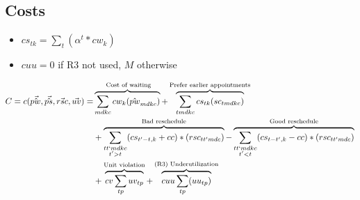\subsection{Costs}

\begin{itemize}
	\item $cs_{tk} = \sum_t (\alpha^t * cw_{k})$
	\item $cuu = 0$ if R3 not used, $M$ otherwise
\end{itemize}

\begin{equation}\begin{alignedat}{10}
		& C = c(\vec{\hat{pw}}, \vec{\hat{ps}}, \vec{rsc}, \vec{uv}) = 
			&& 	\overbrace{
					\sum_{mdkc} cw_{k} (\hat{pw}_{mdkc}) 
				}^\text{ Cost of waiting} 
				+ \overbrace{ 
					\sum_{tmdkc} cs_{tk} (sc_{tmdkc}) 
				}^\text{Prefer earlier appointments} \\ 
		&	&& 	+ \overbrace{ 
					\sum_{ \substack{tt`mdkc \\ t' > t}} 
					(cs_{t'-t, k} + cc) * (rsc_{tt'mdc})
				}^\text{Bad reschedule} 
				- \overbrace{ 
					\sum_{ \substack{tt`mdkc \\ t' < t}} 
					(cs_{t-t', k} - cc) * (rsc_{tt'mdc})
				}^\text{Good reschedule} \\
		& 	&& 	+ \overbrace{
					cv \sum_{tp} uv_{tp}
				}^\text{Unit violation}
			 	+ \overbrace{
					cuu \sum_{tp} (uu_{tp})
				}^\text{(R3) Underutilization}
\end{alignedat}\end{equation}